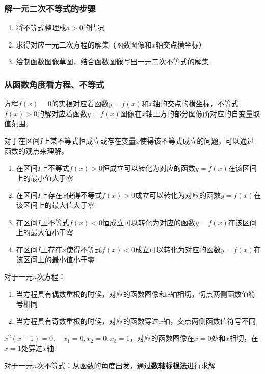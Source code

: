 \subsubsection*{解一元二次不等式的步骤}
\begin{enumerate}
    \item 将不等式整理成$a>0$的情况
    \item 求得对应一元二次方程的解集（函数图像和$x$轴交点横坐标）
    \item 绘制函数图像草图，结合函数图像写出一元二次不等式的解集
\end{enumerate}

\subsubsection*{从函数角度看方程、不等式}
    方程$f(x)=0$的实根对应着函数$y=f(x)$和$x$轴的交点的横坐标，不等式$f(x) > 0$的解对应着函数$y=f(x)$图像在$x$轴上方的部分图像所对应的自变量取值范围。
    \par 对于在区间$I$上某不等式恒成立或存在变量$x$使得该不等式成立的问题，可以通过函数的观点来理解。
    \begin{enumerate}
        \item 在区间$I$上不等式$f(x) > 0$恒成立可以转化为对应的函数$y = f(x)$在该区间上的最小值大于零
        \item 在区间$I$上存在$x$使得不等式$f(x) > 0$成立可以转化为对应的函数$y = f(x)$在该区间上的最大值大于零
        \item 在区间$I$上不等式$f(x) < 0$恒成立可以转化为对应的函数$y = f(x)$在该区间上的最大值小于零
        \item 在区间$I$上存在$x$使得不等式$f(x) < 0$成立可以转化为对应的函数$y = f(x)$在该区间上的最小值小于零
    \end{enumerate}
    对于一元$n$次方程：
    \begin{enumerate} 
        \item 当方程具有偶数重根的时候，对应的函数图像和$x$轴相切，切点两侧函数值符号相同
        \item 当方程具有奇数重根的时候，对应的函数穿过$x$轴，交点两侧函数值符号不同
    \end{enumerate}
    \begin{example}
        $x^2(x-1) = 0, \quad x_1 = 0, x_2 = 0, x_3 = 1$，对应的函数图像在$x = 0$处和$x$相切，在$x = 1$处穿过$x$轴.
    \end{example}
    对于一元$n$次不等式：从函数的角度出发，通过\textbf{数轴标根法}进行求解\\

